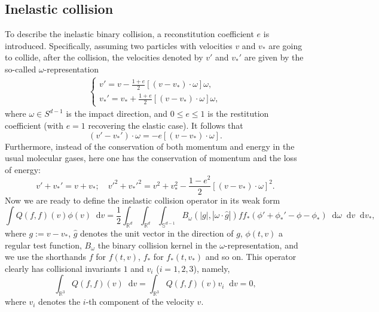 \documentclass[review, times]{elsarticle}
\newcommand*\diff{\mathop{}\!\mathrm{d}}
\begin{document}
\subsection{Inelastic collision }
To describe the inelastic binary collision, a reconstitution coefficient $e$ is introduced. Specifically, assuming two particles with velocities $v$ and $v_*$ are going to collide, after the collision, the velocities denoted by $v'$ and $v_*'$ are given by the so-called $\omega$-representation \cite{Villani2006} 
\begin{align}\label{omega}
\left\{
\begin{array}{l}
\displaystyle v'=v-\frac{1+e}{2}[(v-v_*)\cdot \omega ]\omega, \\[8pt]
\displaystyle v_*'=v_*+\frac{1+e}{2}[(v-v_*)\cdot \omega]\omega,
\end{array}\right.
\end{align}
where $\omega \in S^{d-1}$ is the impact direction, and $0 \leq e \leq 1$ is the restitution coefficient (with $e=1$ recovering the elastic case). It follows that
\begin{equation}
(v'-v_*')\cdot \omega=-e [(v-v_*)\cdot \omega].
\end{equation}
Furthermore, instead of the conservation of both momentum and energy in the usual molecular gases, here one has the conservation of momentum and the loss of energy:
\begin{equation} \label{lossenergy}
v'+v_*'=v+v_*; \quad v'^2+v_*'^2=v^2+v_*^2-\frac{1-e^2}{2}[(v-v_*)\cdot \omega]^2.
\end{equation}
Now we are ready to define the inelastic collision operator in its weak form
\begin{equation} \label{col_omega}
\int Q(f,f)(v)\phi(v)\diff{v}= \frac{1}{2} \int_{\mathbb{R}^d} \int_{\mathbb{R}^d} \int_{\mathbb{S}^{d-1}} B_{\omega}(|g|,|\omega\cdot \hat{g}|)ff_*\left(\phi'+\phi_*'-\phi-\phi_* \right)\diff{\omega} \diff{v} \diff{v_*},
\end{equation}
where $g := v - v_\ast$, $\hat{g}$ denotes the unit vector in the direction of $g$, $\phi(t,v)$ a regular test function, $B_{\omega}$ the binary collision kernel in the $\omega$-representation, and we use the shorthands $f$ for $f(t,v)$, $f_\ast$ for $f_\ast(t, v_\ast)$ and so on. This operator clearly has collisional invariants $1$ and $v_i$ ($i = 1, 2, 3$), namely,
\begin{equation}
  \int_{\mathbb{R}^3} Q(f, f)(v) \diff v = \int_{\mathbb{R}^3} Q(f,f)(v)v_i\diff v = 0,
\end{equation}
where $v_i$ denotes the $i$-th component of the velocity $v$.
\end{document}
